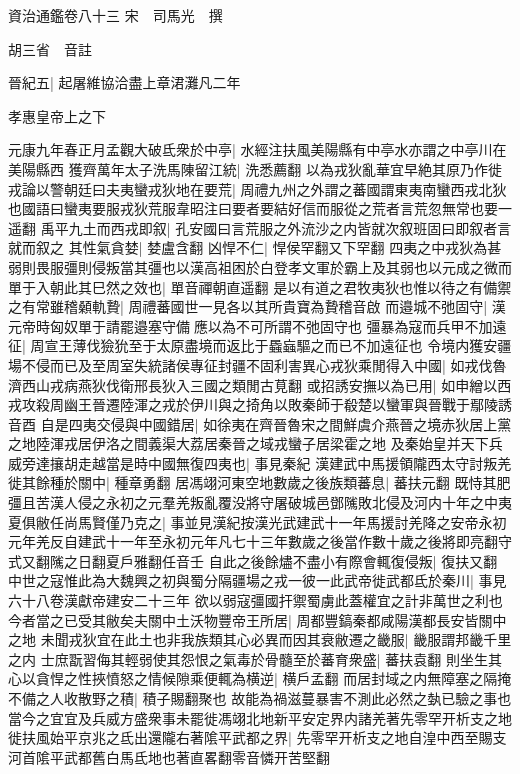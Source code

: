 資治通鑑卷八十三
宋　司馬光　撰

胡三省　音註

晉紀五|{
	起屠維協洽盡上章涒灘凡二年}


孝惠皇帝上之下

元康九年春正月孟觀大破氐衆於中亭|{
	水經注扶風美陽縣有中亭水亦謂之中亭川在美陽縣西}
獲齊萬年太子洗馬陳留江統|{
	洗悉薦翻}
以為戎狄亂華宜早絶其原乃作徙戎論以警朝廷曰夫夷蠻戎狄地在要荒|{
	周禮九州之外謂之蕃國謂東夷南蠻西戎北狄也國語曰蠻夷要服戎狄荒服韋昭注曰要者要結好信而服從之荒者言荒忽無常也要一遥翻}
禹平九土而西戎即叙|{
	孔安國曰言荒服之外流沙之内皆就次叙班固曰即叙者言就而叙之}
其性氣貪婪|{
	婪盧含翻}
凶悍不仁|{
	悍侯罕翻又下罕翻}
四夷之中戎狄為甚弱則畏服彊則侵叛當其彊也以漢高祖困於白登孝文軍於霸上及其弱也以元成之微而單于入朝此其巳然之效也|{
	單音禪朝直遥翻}
是以有道之君牧夷狄也惟以待之有備禦之有常雖稽顙軌贄|{
	周禮蕃國世一見各以其所貴寶為贄稽音啟}
而邉城不弛固守|{
	漢元帝時匈奴單于請罷邉塞守備應以為不可所謂不弛固守也}
彊暴為寇而兵甲不加遠征|{
	周宣王薄伐獫狁至于太原盡境而返比于蟁蝱驅之而已不加遠征也}
令境内獲安疆場不侵而已及至周室失統諸侯專征封疆不固利害異心戎狄乘閒得入中國|{
	如戎伐魯濟西山戎病燕狄伐衛邢長狄入三國之類閒古莧翻}
或招誘安撫以為已用|{
	如申繒以西戎攻殺周幽王晉遷陸渾之戎於伊川與之掎角以敗秦師于殽楚以蠻軍與晉戰于鄢陵誘音酉}
自是四夷交侵與中國錯居|{
	如徐夷在齊晉魯宋之間鮮虞介燕晉之境赤狄居上黨之地陸渾戎居伊洛之間義渠大荔居秦晉之域戎蠻子居梁霍之地}
及秦始皇并天下兵威旁達攘胡走越當是時中國無復四夷也|{
	事見秦紀}
漢建武中馬援領隴西太守討叛羌徙其餘種於關中|{
	種章勇翻}
居馮翊河東空地數歲之後族類蕃息|{
	蕃扶元翻}
既恃其肥彊且苦漢人侵之永初之元羣羌叛亂覆没將守屠破城邑鄧隲敗北侵及河内十年之中夷夏俱敝任尚馬賢僅乃克之|{
	事並見漢紀按漢光武建武十一年馬援討羌降之安帝永初元年羌反自建武十一年至永初元年凡七十三年數歲之後當作數十歲之後將即亮翻守式又翻隲之日翻夏戶雅翻任音壬}
自此之後餘燼不盡小有際會輒復侵叛|{
	復扶又翻}
中世之寇惟此為大魏興之初與蜀分隔疆場之戎一彼一此武帝徙武都氐於秦川|{
	事見六十八卷漢獻帝建安二十三年}
欲以弱寇彊國扞禦蜀虜此蓋權宜之計非萬世之利也今者當之已受其敝矣夫關中土沃物豐帝王所居|{
	周都豐鎬秦都咸陽漢都長安皆關中之地}
未聞戎狄宜在此土也非我族類其心必異而因其衰敝遷之畿服|{
	畿服謂邦畿千里之内}
士庶翫習侮其輕弱使其怨恨之氣毒於骨髓至於蕃育衆盛|{
	蕃扶袁翻}
則坐生其心以貪悍之性挾憤怒之情候隙乘便輒為横逆|{
	横戶孟翻}
而居封域之内無障塞之隔掩不備之人收散野之積|{
	積子賜翻聚也}
故能為禍滋蔓暴害不測此必然之埶已驗之事也當今之宜宜及兵威方盛衆事未罷徙馮翊北地新平安定界内諸羌著先零罕开析支之地徙扶風始平京兆之氐出還隴右著隂平武都之界|{
	先零罕开析支之地自湟中西至賜支河首隂平武都舊白馬氐地也著直畧翻零音憐开苦堅翻}
